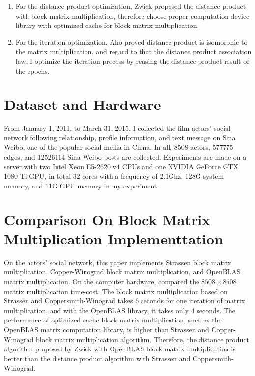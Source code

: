 \documentclass[review]{cvpr}
\begin{document}
\begin{enumerate}
\item For the distance product optimization, Zwick proposed the distance product with block matrix multiplication, therefore choose proper computation device library with optimized cache for block matrix multiplication.
\item For the iteration optimization, Aho proved distance product is isomorphic to the matrix multiplication, and regard to that the distance product association law, I optimize the iteration process by reusing the distance product result of the epochs.
\end{enumerate}


\section{Dataset and Hardware}

From January 1, 2011, to March 31, 2015, I collected the film actors' social network following relationship, profile information, and text message on Sina Weibo, one of the popular social media in China.
In all, 8508 actors, 577775 edges, and 12526114 Sina Weibo posts are collected.
Experiments are made on a server with two Intel Xeon E5-2620 v4 CPUs and one NVIDIA GeForce GTX 1080 Ti GPU, in total 32 cores with a frequency of 2.1Ghz, 128G system memory, and 11G GPU memory in my experiment.



\section{Comparison On Block Matrix Multiplication Implementtation}

On the actors' social network, this paper implements Strassen block matrix multiplication, Copper-Winograd block matrix multiplication, and OpenBLAS matrix multiplication.
On the computer hardware, compared the $8508\times 8508$ matrix multiplication time-cost.
The block matrix multiplication based on Strassen and Coppersmith-Winograd takes 6 seconds for one iteration of matrix multiplication, and with the OpenBLAS library, it takes only 4 seconds.
The performance of optimized cache block matrix multiplication, such as the OpenBLAS matrix computation library, is higher than Strassen and Copper-Winograd block matrix multiplication algorithm.
Therefore, the distance product algorithm proposed by Zwick with OpenBLAS block matrix multiplication is better than the distance product algorithm with Strassen and Coppersmith-Winograd.
\end{document}
